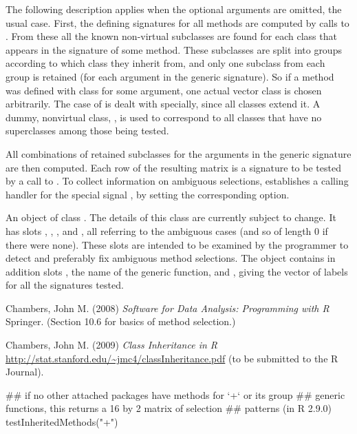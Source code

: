 \begin{Details}\relax
The following description applies when the optional arguments are
omitted, the usual case.
First, the defining signatures for all methods are computed by calls
to .
From these all the known non-virtual subclasses are found for each
class that appears in the signature of some method.
These subclasses are split into groups according to which class they
inherit from, and only one subclass from each group is retained (for
each argument in the generic signature).
So if a method was defined with class  for some
argument, one actual vector class is chosen arbitrarily.
The case of  is dealt with specially, since all classes
extend it.  A dummy, nonvirtual class, , is used to
correspond to all classes that have no superclasses among those being
tested.

All combinations of retained subclasses for the
arguments in the generic signature are then computed.
Each row of the resulting matrix is a signature to be tested by a call
to .
To collect information on ambiguous selections,
 establishes a calling handler for the
special signal , by setting the
corresponding option.
\end{Details}
%
\begin{Value}
An object of class .  The details of
this class are currently subject to change.  It has slots
, , , and
, all referring to the ambiguous cases (and so of length
0 if there were none).  These slots are intended to be examined by the
programmer to detect and preferably fix ambiguous method selections.
The object contains in addition slots , the name of
the generic function, and
,  giving the vector of labels for all
the signatures tested.
\end{Value}
%
\begin{References}\relax
Chambers, John M. (2008)
\emph{Software for Data Analysis: Programming with R}
Springer.  (Section 10.6 for basics of method selection.)

Chambers, John M. (2009)
\emph{Class Inheritance in R}
\url{http://stat.stanford.edu/~jmc4/classInheritance.pdf} (to be
submitted to the R Journal).
\end{References}
%
\begin{Examples}
\begin{ExampleCode}
## if no other attached packages have methods for `+` or its group
## generic functions, this returns a 16 by 2 matrix of selection
## patterns (in R 2.9.0)
testInheritedMethods("+")
\end{ExampleCode}
\end{Examples}
